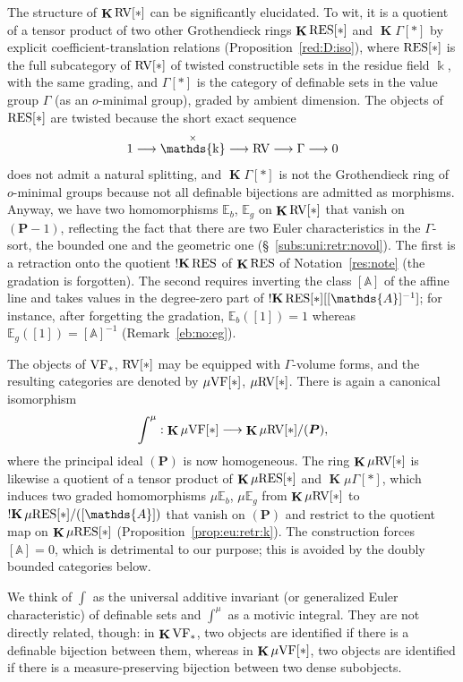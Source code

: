 \documentclass[12pt]{amsart}
\theoremstyle{plain}
\theoremstyle{definition}
\theoremstyle{remark}
\numberwithin{equation}{section}
\theoremstyle{plain}
\newcommand{\VF}{\textup{VF}}
\newcommand{\RV}{\textup{RV}}
\DeclareMathOperator{\K}{\mathds{k}}
\newcommand{\A}{\mathds{A}}
\newcommand{\omin}{$o$\nobreakdash}
\newcommand{\0}{\emptyset}
\newcommand{\bb}[1]{\mathbb{#1}}
\newcommand{\fun}{\longrightarrow}
\newcommand{\mgVF}{{\mu} {\VF}}
\newcommand{\mgRV}{{\mu}{\RV}}
\newcommand{\mG}{{\mu}{\Gamma}}
\newcommand{\RES}{\textup{RES}}
\newcommand{\mgRES}{{\mu}{\RES}}
\newcommand{\mgE}{{\mu}{\bb E}}
\DeclareMathOperator{\ggk}{\mathbf{K}}
\DeclareMathOperator{\sggk}{!\mathbf{K}}
\begin{document}
The structure of $\ggk \RV[*]$ can be significantly elucidated. To wit, it is a quotient of a tensor product of two other Grothendieck rings $\ggk \RES[*]$ and $\ggk \Gamma[*]$ by explicit coefficient-translation relations (Proposition~\ref{red:D:iso}), where  $\RES[*]$ is the full subcategory of $\RV[*]$ of twisted constructible sets in the residue field $\K$, with the same grading, and $\Gamma[*]$ is the category of definable sets in the value group $\Gamma$ (as an \omin-minimal group), graded by ambient dimension. The objects of $\RES[*]$ are twisted because the short exact sequence
\[
1 \fun \K^\times \fun \RV \fun \Gamma \fun 0
\]
does not admit a natural splitting, and $\ggk \Gamma[*]$ is not the Grothendieck ring of \omin-minimal groups because not all definable bijections are admitted as morphisms. Anyway, we have two homomorphisms $\bb E_{b}$, $\bb E_{g}$ on $\ggk \RV[*]$ that vanish on $(\bm P-1)$, reflecting the fact that there are two Euler characteristics in the $\Gamma$-sort, the bounded one and the geometric one (\S~\ref{subs:uni:retr:novol}). The first is a retraction onto the quotient $\sggk \RES$ of $\ggk \RES$ of Notation~\ref{res:note} (the gradation is forgotten). The second requires inverting the class $[\A]$ of the affine line and takes values in the degree-zero part of $\sggk \RES[*][[\A]^{-1}]$; for instance, after forgetting the gradation, $\bb E_{b}([1]) = 1$ whereas $\bb E_{g}([1]) = [\A]^{-1}$ (Remark~\ref{eb:no:eg}).


The objects of $\VF_*$, $\RV[*]$ may be equipped with $\Gamma$-volume forms, and the resulting categories are denoted by $\mgVF[*]$, $\mgRV[*]$. There is again a  canonical isomorphism
\[
\int^\mu : \ggk\mgVF[*] \fun \ggk\mgRV[*]/(\bm P),
\]
where the principal ideal $(\bm P)$ is now homogeneous. The ring $\ggk\mgRV[*]$ is likewise a quotient of a tensor product of  $\ggk \mgRES[*]$ and $\ggk \mG[*]$, which induces two graded homomorphisms $\mgE_ {b}$, $\mgE_{g}$ from $\ggk\mgRV[*]$ to $\sggk \mgRES[*]/([\A])$ that vanish on $(\bm P)$ and restrict to the quotient map on $\ggk \mgRES[*]$ (Proposition~\ref{prop:eu:retr:k}). The construction forces $[\A] = 0$, which is detrimental to our purpose; this is avoided by the doubly bounded categories below.


We think of $\int$ as the universal additive invariant (or generalized Euler characteristic) of definable sets and $\int^\mu$ as a motivic integral. They are not directly related, though: in  $\ggk\VF_*$, two objects are identified if there is a definable bijection between them, whereas in $\ggk\mgVF[*]$, two objects are identified if there is a measure-preserving bijection between two dense subobjects.
\end{document}
